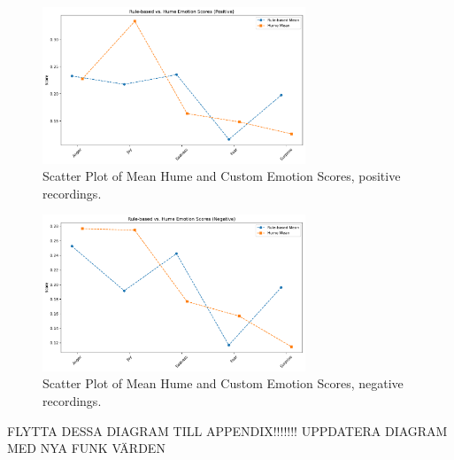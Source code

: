\begin{figure}[H]
    \centering 
    \includegraphics[width=0.7\textwidth]{png/results/rq1_nr3/praat_hume_positive_scatter.pdf}
    \caption{Scatter Plot of Mean Hume and Custom Emotion Scores, positive recordings.}
    \label{fig:rq1_scatter_custom_hume_pos}
\end{figure}
\begin{figure}[H]
    \centering 
    \includegraphics[width=0.7\textwidth]{png/results/rq1_nr3/praat_hume_negative_scatter.pdf}
    \caption{Scatter Plot of Mean Hume and Custom Emotion Scores, negative recordings.}
    \label{fig:rq1_scatter_custom_hume_neg}
\end{figure}


\medskip

FLYTTA DESSA DIAGRAM TILL APPENDIX!!!!!!! UPPDATERA DIAGRAM MED NYA FUNK VÄRDEN 

